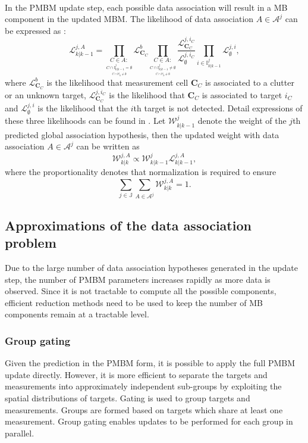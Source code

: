 ~\\
In the PMBM update step, each possible data association will result in a MB component in the updated MBM. The likelihood of data association $A\in\mathcal{A}^j$ can be expressed as \cite{pmbmextended2}:
\begin{equation}
\mathcal{L}^{j,A}_{k|k-1}=\prod_{\underset{\underset{C\cap \mathbb{M}_k\neq \emptyset}{C\cap \mathbb{I}^j_{k|k-1}=\emptyset}}{C\in A:}}\mathcal{L}^b_{\mathbf{C}_C}\prod_{\underset{\underset{C\cap \mathbb{M}_k\neq \emptyset}{C\cap \mathbb{I}^j_{k|k-1}\neq\emptyset}}{C\in A:}}\frac{\mathcal{L}^{j,i_C}_{\mathbf{C}_C}}{\mathcal{L}^{j,i_C}_{\emptyset}}\prod_{i\in\mathbb{I}^j_{k|k-1}}\mathcal{L}^{j,i}_{\emptyset},
\end{equation}
where $\mathcal{L}^b_{\mathbf{C}_C}$ is the likelihood that measurement cell $\mathbf{C}_C$ is associated to a clutter or an unknown target, $\mathcal{L}^{j,i_C}_{\mathbf{C}_C}$ is the likelihood that $\mathbf{C}_C$ is associated to target $i_C$ and $\mathcal{L}^{j,i}_{\emptyset}$ is the likelihood that the $i$th target is not detected. Detail expressions of these three likelihoods can be found in \cite{pmbmextended2}. Let $\mathcal{W}^j_{k|k-1}$ denote the weight of the $j$th predicted global association hypothesis, then the updated weight with data association $A\in\mathcal{A}^j$ can be written as
\begin{equation}
\mathcal{W}^{j,A}_{k|k}\propto \mathcal{W}^{j}_{k|k-1}\mathcal{L}^{j,A}_{k|k-1},
\end{equation}
where the proportionality denotes that normalization is required to ensure
\begin{equation}
    \sum_{j\in\mathbb{J}}\sum_{A\in\mathcal{A}^j}\mathcal{W}^{j,A}_{k|k}=1.
\end{equation}

\subsection{Approximations of the data association problem}
Due to the large number of data association hypotheses generated in the update step, the number of PMBM parameters increases rapidly as more data is observed. Since it is not tractable to compute all the possible components, efficient reduction methods need to be used to keep the number of MB components remain at a tractable level. 


\subsubsection{Group gating}
Given the prediction in the PMBM form, it is possible to apply the full PMBM update directly. However, it is more efficient to separate the targets and measurements into approximately independent sub-groups by exploiting the spatial distributions of targets. Gating \cite[Sec. 2.2.2.2]{gating} is used to group targets and measurements. Groups are formed based on targets which share at least one measurement. Group gating enables updates to be performed for each group in parallel.



